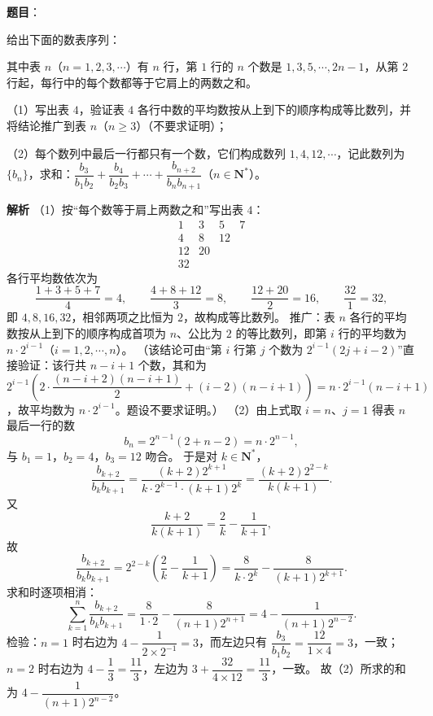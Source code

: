 \begin{answer}

\textbf{题目}：

给出下面的数表序列：
\nopagebreak[4]
\begin{center}\end{center}
\nopagebreak[4]
其中表 $n$（$n=1,2,3,\cdots$）有 $n$ 行，第 $1$ 行的 $n$ 个数是 $1,3,5,\cdots,2n-1$，从第 $2$ 行起，每行中的每个数都等于它肩上的两数之和。

（1）写出表 $4$，验证表 $4$ 各行中数的平均数按从上到下的顺序构成等比数列，并将结论推广到表 $n$（$n\geqslant3$）（不要求证明）；

（2）每个数列中最后一行都只有一个数，它们构成数列 $1,4,12,\cdots$，记此数列为 $\{b_n\}$，求和：$\dfrac{b_3}{b_1b_2}+\dfrac{b_4}{b_2b_3}+\cdots+\dfrac{b_{n+2}}{b_nb_{n+1}}$（$n\in\mathbf N^*$）。

\textbf{解析}
（1）按“每个数等于肩上两数之和”写出表 $4$：
\nopagebreak[4]
\[\begin{array}{llll}
1 & 3 & 5 & 7\\
4 & 8 & 12 & \\
12 & 20 & & \\
32 & & &
\end{array}\]
各行平均数依次为
\nopagebreak[4]
\[\frac{1+3+5+7}{4}=4,\qquad\frac{4+8+12}{3}=8,\qquad\frac{12+20}{2}=16,\qquad\frac{32}{1}=32,\]
即 $4,8,16,32$，相邻两项之比恒为 $2$，故构成等比数列。
推广：表 $n$ 各行的平均数按从上到下的顺序构成首项为 $n$、公比为 $2$ 的等比数列，即第 $i$ 行的平均数为 $n\cdot2^{i-1}$（$i=1,2,\cdots,n$）。
（该结论可由“第 $i$ 行第 $j$ 个数为 $2^{i-1}(2j+i-2)$”直接验证：该行共 $n-i+1$ 个数，其和为 $2^{i-1}\left(2\cdot\dfrac{(n-i+2)(n-i+1)}{2}+(i-2)(n-i+1)\right)=n\cdot2^{i-1}(n-i+1)$，故平均数为 $n\cdot2^{i-1}$。题设不要求证明。）
（2）由上式取 $i=n$、$j=1$ 得表 $n$ 最后一行的数
\nopagebreak[4]
\[b_n=2^{n-1}(2+n-2)=n\cdot2^{n-1},\]
与 $b_1=1$，$b_2=4$，$b_3=12$ 吻合。
于是对 $k\in\mathbf N^*$，
\nopagebreak[4]
\[\frac{b_{k+2}}{b_kb_{k+1}}=\frac{(k+2)2^{k+1}}{k\cdot2^{k-1}\cdot(k+1)2^{k}}=\frac{(k+2)2^{2-k}}{k(k+1)}.\]
又
\nopagebreak[4]
\[\frac{k+2}{k(k+1)}=\frac2k-\frac1{k+1},\]
故
\nopagebreak[4]
\[\frac{b_{k+2}}{b_kb_{k+1}}=2^{2-k}\left(\frac2k-\frac1{k+1}\right)=\frac{8}{k\cdot2^k}-\frac{8}{(k+1)2^{k+1}}.\]
求和时逐项相消：
\nopagebreak[4]
\[\sum_{k=1}^{n}\frac{b_{k+2}}{b_kb_{k+1}}=\frac{8}{1\cdot2}-\frac{8}{(n+1)2^{n+1}}=4-\frac{1}{(n+1)2^{n-2}}.\]
检验：$n=1$ 时右边为 $4-\dfrac{1}{2\times2^{-1}}=3$，而左边只有 $\dfrac{b_3}{b_1b_2}=\dfrac{12}{1\times4}=3$，一致；$n=2$ 时右边为 $4-\dfrac13=\dfrac{11}3$，左边为 $3+\dfrac{32}{4\times12}=\dfrac{11}3$，一致。
故（2）所求的和为 $4-\dfrac{1}{(n+1)2^{n-2}}$。


\end{answer}
